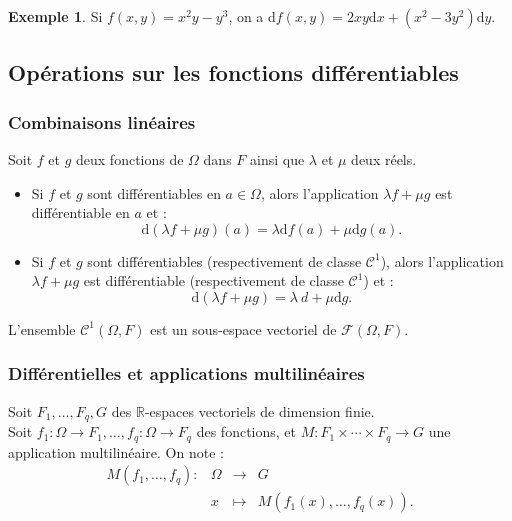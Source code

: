 \documentclass[french]{article}
\newcommand{\R}{\mathbb{R}}
\renewcommand{\d}{\text{d}}
\theoremstyle{plain}
\theoremstyle{definition}
\newtheorem*{ex}{Exemple}
\theoremstyle{remark}
\begin{document}
\begin{ex}
	Si $f(x,y)=x^2y-y^3$, on a $\d f(x,y)=2xy\d x+(x^2-3y^2)\d y$.
\end{ex}


\subsection{Opérations sur les fonctions différentiables}

\subsubsection*{Combinaisons linéaires}

\begin{prop}[Linéarité]%
	Soit $f$ et $g$ deux fonctions de $\Omega$ dans $F$ ainsi que $\lambda$ et $\mu$ deux réels.
	\begin{itemize}
		\item Si $f$ et $g$ sont différentiables en $a\in\Omega$, alors l'application $\lambda f+\mu g$ est différentiable en $a$ et :
		$$\d(\lambda f+\mu g)(a)=\lambda\d f(a)+\mu\d g(a).$$
		\item Si $f$ et $g$ sont différentiables (respectivement de classe $\mathcal{C}^1$), alors l'application $\lambda f+\mu g$ est différentiable (respectivement de classe $\mathcal{C}^1$) et :
		$$\d(\lambda f+\mu g)=\lambda\ d+\mu\d g.$$
	\end{itemize}
\end{prop}

\begin{cor}%
	L'ensemble $\mathcal{C}^1(\Omega,F)$ est un sous-espace vectoriel de $\mathcal{F}(\Omega,F)$.
\end{cor}

\subsubsection*{Différentielles et applications multilinéaires}

Soit $F_1,\ldots,F_q,G$ des $\R$-espaces vectoriels de dimension finie.\\
Soit $f_1:\Omega\to F_1,\ldots,f_q:\Omega\to F_q$ des fonctions, et $M:F_1\times\cdots\times F_q\to G$ une application multilinéaire. On note :
$$\begin{array}{lrcl}
	M(f_1,\ldots,f_q):&\Omega&\longrightarrow&G\\
	&x&\longmapsto&M(f_1(x),\ldots,f_q(x)).
\end{array}$$
\end{document}
